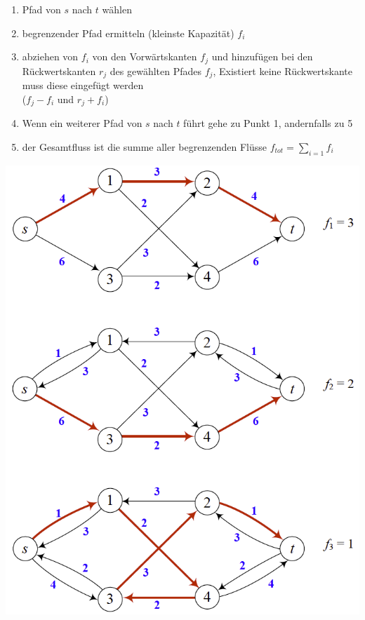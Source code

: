 \begin{minipage}{0.7\textwidth}
	\begin{enumerate}
		\item Pfad von $s$ nach $t$ wählen
		\item begrenzender Pfad ermitteln (kleinste Kapazität) $f_i$
		\item abziehen von $f_i$ von den Vorwärtskanten $f_j$ und hinzufügen bei den Rückwertskanten $r_j$ des gewählten Pfades $f_j$, Existiert keine Rückwertskante muss diese eingefügt werden\\ ($f_j-f_i$ und $r_j + f_i$)
		\item Wenn ein weiterer Pfad von $s$ nach $t$ führt gehe zu  Punkt 1, andernfalls zu 5
		\item der Gesamtfluss ist die summe aller begrenzenden Flüsse $f_{tot} = \sum_{i=1} f_i$
	\end{enumerate}
\end{minipage}
\begin{minipage}{0.3\textwidth}
	\includegraphics[width=\textwidth]{Content/Graphen/FordFulkerson.png}
\end{minipage}




